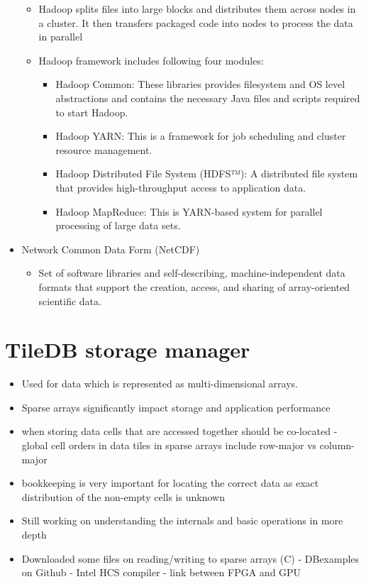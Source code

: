 \begin{itemize}
\begin{itemize}
		\item Hadoop splits files into large blocks and distributes them across nodes in a cluster. It then transfers packaged code into nodes to process the data in parallel
		\item Hadoop framework includes following four modules:
		\begin{itemize}
			\item Hadoop Common: These libraries provides filesystem and OS level abstractions and contains the necessary Java files and scripts required to start Hadoop.
			\item Hadoop YARN: This is a framework for job scheduling and cluster resource management.
			\item Hadoop Distributed File System (HDFS™): A distributed file system that provides high-throughput access to application data.
			\item Hadoop MapReduce: This is YARN-based system for parallel processing of large data sets.
		\end{itemize}
	\end{itemize}
	\item Network Common Data Form (NetCDF)
	\begin{itemize}
		\item Set of software libraries and self-describing, machine-independent data formats that support the creation, access, and sharing of array-oriented scientific data.
	\end{itemize}
\end{itemize}

\section{TileDB storage manager}
\begin{itemize}
	\item Used for data which is represented as multi-dimensional arrays.
	\item Sparse arrays significantly impact storage and application performance
	\item when storing data cells that are accessed together should be co-located -  global cell orders in data tiles in sparse arrays include row-major vs column-major
	\item bookkeeping is very important for locating the correct data as exact distribution of the non-empty cells is unknown
	\item Still working on understanding the internals and basic operations in more depth
	\item Downloaded some files on reading/writing to sparse arrays (C) - DBexamples on Github - Intel HCS compiler - link between FPGA and GPU
\end{itemize}

